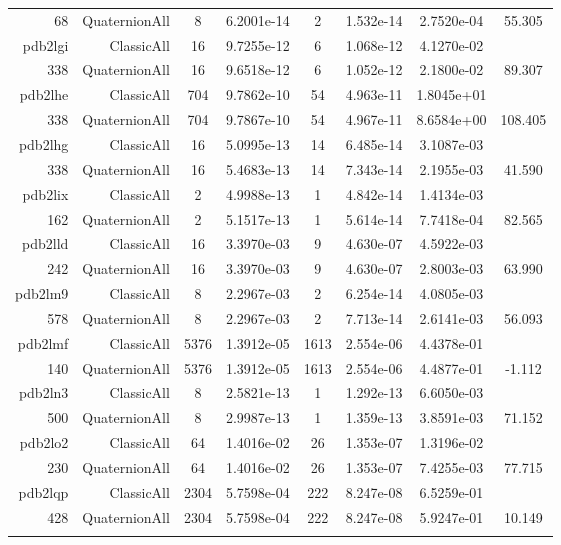 \begin{xltabular}{\textwidth}{r|rcS[table-format=1.4e+2]cS[table-format=1.3e+2]S[table-format=1.4e+2]S[table-format=-1.3]}
68 & QuaternionAll & 8 & 6.2001e-14 & 2 & 1.532e-14 & 2.7520e-04 & 55.305\\  \addlinespace
pdb2lgi & ClassicAll & 16 & 9.7255e-12 & 6 & 1.068e-12 & 4.1270e-02 & \\
338 & QuaternionAll & 16 & 9.6518e-12 & 6 & 1.052e-12 & 2.1800e-02 & 89.307\\  \addlinespace
pdb2lhe & ClassicAll & 704 & 9.7862e-10 & 54 & 4.963e-11 & 1.8045e+01 & \\
338 & QuaternionAll & 704 & 9.7867e-10 & 54 & 4.967e-11 & 8.6584e+00 & 108.405\\  \addlinespace
pdb2lhg & ClassicAll & 16 & 5.0995e-13 & 14 & 6.485e-14 & 3.1087e-03 & \\
338 & QuaternionAll & 16 & 5.4683e-13 & 14 & 7.343e-14 & 2.1955e-03 & 41.590\\  \addlinespace
pdb2lix & ClassicAll & 2 & 4.9988e-13 & 1 & 4.842e-14 & 1.4134e-03 & \\
162 & QuaternionAll & 2 & 5.1517e-13 & 1 & 5.614e-14 & 7.7418e-04 & 82.565\\  \addlinespace
pdb2lld & ClassicAll & 16 & 3.3970e-03 & 9 & 4.630e-07 & 4.5922e-03 & \\
242 & QuaternionAll & 16 & 3.3970e-03 & 9 & 4.630e-07 & 2.8003e-03 & 63.990\\  \addlinespace
pdb2lm9 & ClassicAll & 8 & 2.2967e-03 & 2 & 6.254e-14 & 4.0805e-03 & \\
578 & QuaternionAll & 8 & 2.2967e-03 & 2 & 7.713e-14 & 2.6141e-03 & 56.093\\  \addlinespace
pdb2lmf & ClassicAll & 5376 & 1.3912e-05 & 1613 & 2.554e-06 & 4.4378e-01 & \\
140 & QuaternionAll & 5376 & 1.3912e-05 & 1613 & 2.554e-06 & 4.4877e-01 & -1.112\\  \addlinespace
pdb2ln3 & ClassicAll & 8 & 2.5821e-13 & 1 & 1.292e-13 & 6.6050e-03 & \\
500 & QuaternionAll & 8 & 2.9987e-13 & 1 & 1.359e-13 & 3.8591e-03 & 71.152\\  \addlinespace
pdb2lo2 & ClassicAll & 64 & 1.4016e-02 & 26 & 1.353e-07 & 1.3196e-02 & \\
230 & QuaternionAll & 64 & 1.4016e-02 & 26 & 1.353e-07 & 7.4255e-03 & 77.715\\  \addlinespace
pdb2lqp & ClassicAll & 2304 & 5.7598e-04 & 222 & 8.247e-08 & 6.5259e-01 & \\
428 & QuaternionAll & 2304 & 5.7598e-04 & 222 & 8.247e-08 & 5.9247e-01 & 10.149\\  \addlinespace

\end{xltabular}
